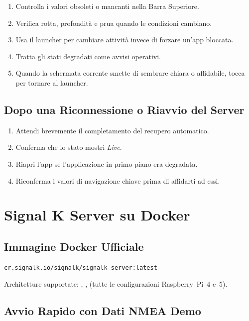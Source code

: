 \begin{enumerate}
  \item Controlla i valori obsoleti o mancanti nella Barra Superiore.
  \item Verifica rotta, profondità e prua quando le condizioni cambiano.
  \item Usa il launcher per cambiare attività invece di forzare un'app bloccata.
  \item Tratta gli stati degradati come avvisi operativi.
  \item Quando la schermata corrente smette di sembrare chiara o affidabile, tocca
        ~ per tornare al launcher.
\end{enumerate}

\section{Dopo una Riconnessione o Riavvio del Server}

\begin{enumerate}
  \item Attendi brevemente il completamento del recupero automatico.
  \item Conferma che lo stato mostri \textit{Live}.
  \item Riapri l'app se l'applicazione in primo piano era degradata.
  \item Riconferma i valori di navigazione chiave prima di affidarti ad essi.
\end{enumerate}

\chapter{Signal K Server su Docker}
\label{ch:docker}

\section{Immagine Docker Ufficiale}

\begin{lstlisting}
cr.signalk.io/signalk/signalk-server:latest
\end{lstlisting}

Architetture supportate: , , 
(tutte le configurazioni Raspberry~Pi~4 e~5).

\section{Avvio Rapido con Dati NMEA Demo}

